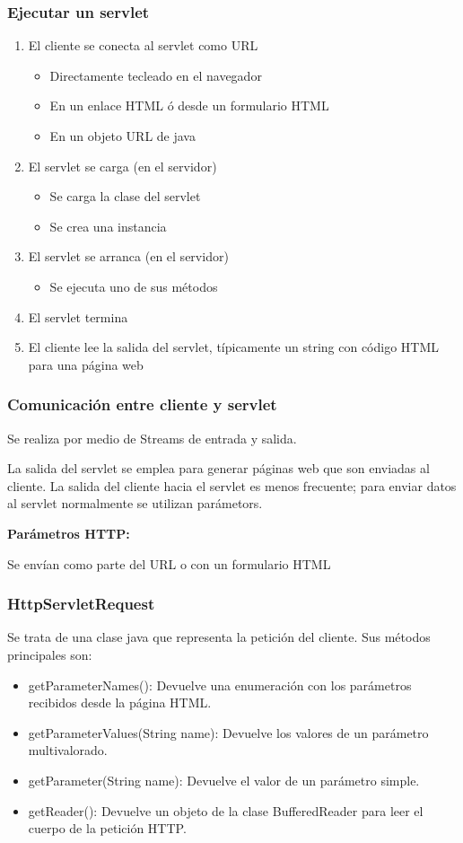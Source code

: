 \documentclass{apuntes}
\begin{document}
\subsubsection{Ejecutar un servlet}
\begin{enumerate}
\item El cliente se conecta al servlet como URL
\begin{itemize}
\item Directamente tecleado en el navegador
\item En un enlace HTML ó desde un formulario HTML
\item En un objeto URL de java
\end{itemize}
\item El servlet se carga (en el servidor)
\begin{itemize}
\item Se carga la clase del servlet
\item Se crea una instancia
\end{itemize}
\item El servlet se arranca (en el servidor)
\begin{itemize}
\item Se ejecuta uno de sus métodos
\end{itemize}
\item El servlet termina
\item El cliente lee la salida del servlet, típicamente un string con código HTML para una página web
\end{enumerate}

\subsubsection{Comunicación entre cliente y servlet}
Se realiza por medio de Streams de entrada y salida.

La salida del servlet se emplea para generar páginas web que son enviadas al cliente. La salida del cliente hacia el servlet es menos frecuente; para enviar datos al servlet normalmente se utilizan parámetors.

\textbf{Parámetros HTTP:}

Se envían como parte del URL o con un formulario HTML

\subsubsection{HttpServletRequest}
Se trata de una clase java que representa la petición del cliente. Sus métodos principales son:
\begin{itemize}
\item getParameterNames(): Devuelve una enumeración con los
parámetros recibidos desde la página HTML.
\item getParameterValues(String name): Devuelve los valores de un parámetro multivalorado.
\item getParameter(String name): Devuelve el valor de un
parámetro simple.
\item getReader(): Devuelve un objeto de la clase BufferedReader para leer el cuerpo de la petición HTTP.
\end{itemize}
\end{document}

